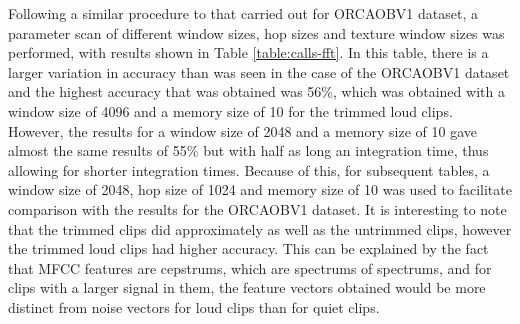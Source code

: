 \documentclass[12pt,oneside]{book}
\begin{document}
Following a similar procedure to that carried out for ORCAOBV1
dataset, a parameter scan of different window sizes, hop sizes and
texture window sizes was performed, with results shown in Table
\ref{table:calls-fft}.  In this table, there is a larger variation in
accuracy than was seen in the case of the ORCAOBV1 dataset and the
highest accuracy that was obtained was 56\%, which was obtained with a
window size of 4096 and a memory size of 10 for the trimmed loud
clips.  However, the results for a window size of 2048 and a memory
size of 10 gave almost the same results of 55\% but with half as long
an integration time, thus allowing for shorter integration
times. Because of this, for subsequent tables, a window size of 2048,
hop size of 1024 and memory size of 10 was used to facilitate
comparison with the results for the ORCAOBV1 dataset.  It is
interesting to note that the trimmed clips did approximately as well
as the untrimmed clips, however the trimmed loud clips had higher
accuracy.  This can be explained by the fact that MFCC features are
cepstrums, which are spectrums of spectrums, and for clips with a
larger signal in them, the feature vectors obtained would be more
distinct from noise vectors for loud clips than for quiet clips.
\end{document}
